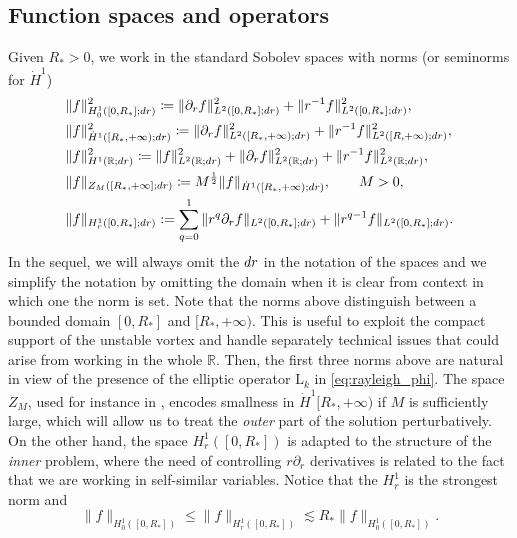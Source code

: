 \documentclass[11pt,reqno]{amsproc}
\def\dd{{\rm d}}
\def\de{{\partial}}
\def\RR {\mathbb{R}}
\newcommand{\rmL}{\mathrm{L}}
\theoremstyle{definition}
\theoremstyle{definition}
\numberwithin{equation}{section}
\begin{document}
\subsection{Function spaces and operators}
\label{sec:functionspace}
Given $ R_*>0$, we work in the standard Sobolev spaces with norms (or seminorms for $\dot{H}^1$) \begin{align}
\label{def:H10}&\|f\|_{H^1_0([0,R_*];\dd r)}^2\coloneqq \|\de_r f\|_{L^2([0,R_*];\dd r)}^2+\|r^{-1}f\|^2_{L^2([0,R_*];\dd r)},\\
\label{def:H1dot}&\|f\|_{\dot{H}^1([R_*,+\infty);\dd r)}^2\coloneqq \|\de_r f\|_{L^2([R_*,+\infty);\dd r)}^2+\|r^{-1}f\|^2_{L^2([R,+\infty);\dd r)},\\
\label{def:H1}&\|f\|_{H^1(\RR;\dd r)}^2\coloneqq \|f\|_{L^2(\RR;\dd r)}^2 +\|\de_r f\|_{L^2(\RR;\dd r)}^2+\|r^{-1}f\|^2_{L^2(\RR;\dd r)},\\
\label{def:ZM} &\|f\|_{Z_M([R_*,+\infty];\dd r)}\coloneqq M^\frac12\|f\|_{\dot{H}^1([R_*,+\infty);\dd r)}, \qquad M>0,\\
\label{def:H1r} &\|f\|_{H^1_r([0,R_*];\dd r)}:=\sum_{q=0}^1\|r^q\de_r f\|_{L^2([0,R_*];\dd r)}+\|r^{q-1}f\|_{L^2([0,R_*];\dd r)}.
\end{align}
In the sequel, we will always omit the $\dd r$ in the notation of the spaces and we simplify the notation by omitting the domain when it is clear from context in which one the norm is set. Note that the norms above distinguish between a bounded domain $[0,R_*]$ and $[R_*,+\infty)$. This is useful to exploit the compact support of the unstable vortex and handle separately technical issues that could arise from working in the whole $\RR$. Then, the first  three norms above are natural in view of the presence of the elliptic operator $\rmL_k$ in \cref{eq:rayleigh_phi}. The space $Z_M$, used for instance in \cite{kumar2023simple},  encodes smallness in $\dot{H}^1[R_*,+\infty)$ if $M$ is sufficiently large, which will allow us to treat the \textit{outer} part of the solution perturbatively. On the other hand, the space $H^1_r([0,R_*])$ is adapted to the structure of the \textit{inner} problem, where the need of controlling $r\de_r$ derivatives is related to the fact that we are working in self-similar variables.
Notice that the $H^1_r$ is the strongest norm and 
\begin{equation}
    \|f\|_{H^1_0([0,R_*])}\leq \|f\|_{H^1_r([0,R_*])} \lesssim R_*\|f\|_{H^1_0([0,R_*])}.
\end{equation}
\end{document}
